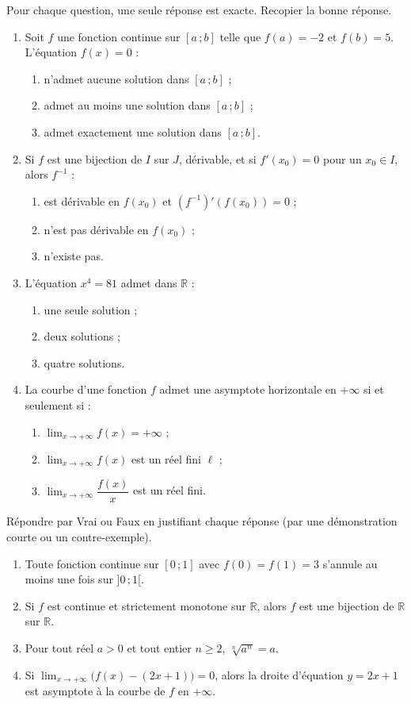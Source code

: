 \documentclass[11pt]{article}
\begin{document}
\begin{exercice}[QCM]
Pour chaque question, une seule réponse est exacte. Recopier la bonne réponse.
\begin{enumerate}
\item Soit $f$ une fonction continue sur $[a\,;b]$ telle que $f(a)=-2$ et $f(b)=5$. L'équation $f(x)=0$ :
\begin{enumerate}
\item n'admet aucune solution dans $[a\,;b]$ ;
\item admet au moins une solution dans $[a\,;b]$ ;
\item admet exactement une solution dans $[a\,;b]$.
\end{enumerate}
\item Si $f$ est une bijection de $I$ sur $J$, dérivable, et si $f'(x_0)=0$ pour un $x_0\in I$, alors $f^{-1}$ :
\begin{enumerate}
\item est dérivable en $f(x_0)$ et $(f^{-1})'(f(x_0))=0$ ;
\item n'est pas dérivable en $f(x_0)$ ;
\item n'existe pas.
\end{enumerate}
\item L'équation $x^4=81$ admet dans $\mathbb{R}$ :
\begin{enumerate}
\item une seule solution ; \item deux solutions ; \item quatre solutions.
\end{enumerate}
\item La courbe d'une fonction $f$ admet une asymptote horizontale en $+\infty$ si et seulement si :
\begin{enumerate}
\item $\lim_{x\to+\infty}f(x)=+\infty$ ;
\item $\lim_{x\to+\infty}f(x)$ est un réel fini $\ell$ ;
\item $\lim_{x\to+\infty}\dfrac{f(x)}{x}$ est un réel fini.
\end{enumerate}
\end{enumerate}
\end{exercice}

\begin{exercice}
Répondre par Vrai ou Faux en justifiant chaque réponse (par une démonstration courte ou un contre-exemple).
\begin{enumerate}
\item Toute fonction continue sur $[0\,;1]$ avec $f(0)=f(1)=3$ s'annule au moins une fois sur $]0\,;1[$.
\item Si $f$ est continue et strictement monotone sur $\mathbb{R}$, alors $f$ est une bijection de $\mathbb{R}$ sur $\mathbb{R}$.
\item Pour tout réel $a>0$ et tout entier $n\geq 2$, $\sqrt[n]{a^n}=a$.
\item Si $\lim_{x\to+\infty}\big(f(x)-(2x+1)\big)=0$, alors la droite d'équation $y=2x+1$ est asymptote à la courbe de $f$ en $+\infty$.
\end{enumerate}
\end{exercice}
\end{document}
